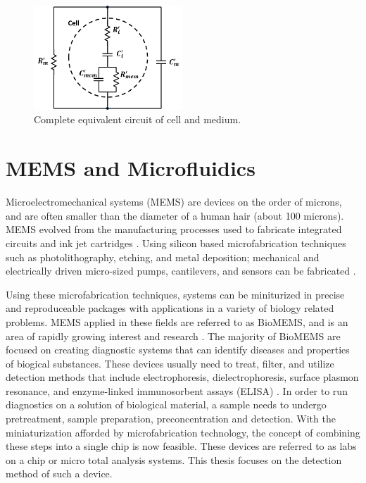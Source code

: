  \begin{figure}
     \centering
     \includegraphics[width=0.5\textwidth]{images/completeCellMediumCircuit.png}
     \caption{Complete equivalent circuit of cell and medium.}
     \label{fig:complete_equiv_circuit_cell_medium}
 \end{figure}
 
 \section[MEMs and Microfluidics]{MEMS and Microfluidics}
 
 \par Microelectromechanical systems (MEMS) are devices on the order of microns, and are often smaller than the diameter of a human hair (about 100 microns). MEMS evolved from the manufacturing processes used to fabricate integrated circuits and ink jet cartridges \cite{xia_soft_1998-1}. Using silicon based microfabrication techniques such as photolithography, etching, and metal deposition; mechanical and electrically driven micro-sized pumps, cantilevers, and sensors can be fabricated \cite{wang_bio-mems:_2006}. 
 
 \par Using these microfabrication techniques, systems can be miniturized in precise and reproduceable packages with applications in a variety of biology related problems. MEMS applied in these fields are referred to as BioMEMS, and is an area of rapidly growing interest and research \cite{grayson_biomems_2004}. The majority of BioMEMS are focused on creating diagnostic systems that can identify diseases and properties of biogical substances. These devices usually need to treat, filter, and utilize detection methods that include electrophoresis, dielectrophoresis, surface plasmon resonance, and enzyme-linked immunosorbent assays (ELISA) \cite{foudeh_microfluidic_2012}. In order to run diagnostics on a solution of biological material, a sample needs to undergo pretreatment, sample preparation, preconcentration and detection. With the miniaturization afforded by microfabrication technology, the concept of combining these steps into a single chip is now feasible. These devices are referred to as labs on a chip or micro total analysis systems. This thesis focuses on the detection method of such a device.
 
